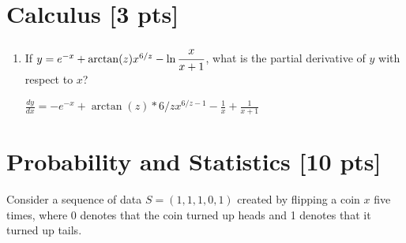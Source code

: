 \documentclass[a4paper]{article}
\theoremstyle{definition}
\newenvironment{soln}{
	\leavevmode\color{blue}\ignorespaces
}{}
\begin{document}
	
	\section{Calculus [3 pts]}
	\begin{enumerate}
		\item If $y = e^{-x} + \arctan(z)x^{6/z} - \ln\cfrac{x}{x+1}$, what is the partial derivative of $y$ with respect to $x$?\\
		\begin{soln}
			$\frac{d y}{d x} = -e^{-x} + \arctan(z)*6/zx^{6/z-1} - \frac{1}{x}+ \frac{1}{x+1}$
		\end{soln}
	\end{enumerate}
	
	
	
	
	\section{Probability and Statistics [10 pts]}
	Consider a sequence of data $S = (1, 1, 1, 0, 1)$ created by flipping a coin $x$ five times, where 0 denotes that the coin turned up heads and 1 denotes that it turned up tails.
\end{document}
